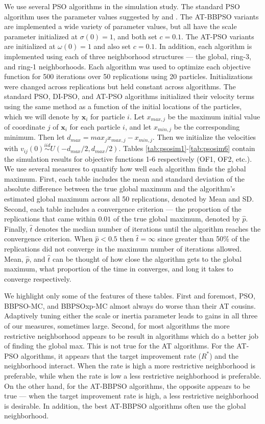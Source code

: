 \documentclass[12pt]{article}
\begin{document}
We use several PSO algorithms in the simulation study. The standard PSO algorithm uses the parameter values suggested by \cite{blum2008swarm} and \cite{clerc2002particle}. The AT-BBPSO variants are implemented a wide variety of parameter values, but all have the scale parameter initialized at $\sigma(0)=1$, and both set $c=0.1$. The AT-PSO variants are initialized at $\omega(0)=1$ and also set $c=0.1$. In addition, each algorithm is implemented using each of three neighborhood structures --- the global, ring-3, and ring-1 neighborhoods. Each algorithm was used to optimize each objective function for 500 iterations over 50 replications using 20 particles. Initializations were changed across replications but held constant across algorithms. The standard PSO, DI-PSO, and AT-PSO algorithms initialized their velocity terms using the same method as a function of the initial locations of the particles, which we will denote by $\bm{x}_i$ for particle $i$. Let $x_{max,j}$ be the maximum initial value of coordinate $j$ of $\bm{x}_i$ for each particle $i$, and let $x_{min,j}$ be the corresponding minimum. Then let $d_{max} = max_{j}x_{max,j} - x_{min,j}$. Then we initialize the velocities with $v_{ij}(0)\stackrel{iid}{\sim}U(-d_{max}/2,d_{max}/2)$. Tables \ref{tab:psosim1}-\ref{tab:psosim6} contain the simulation results for objective functions 1-6 respectively (OF1, OF2, etc.). We use several measures to quantify how well each algorithm finds the global maximum. First, each table includes the mean and standard deviation of the absolute difference between the true global maximum and the algorithm's estimated global maximum across all 50 replications, denoted by Mean and SD. Second, each table includes a convergence criterion --- the proportion of the replications that came within $0.01$ of the true global maximum, denoted by $\widehat{p}$. Finally, $\widehat{t}$ denotes the median number of iterations until the algorithm reaches the convergence criterion. When $\hat{p}<0.5$ then $\hat{t} = \infty$ since greater than 50\% of the replications did not converge in the maximum number of iterations allowed. Mean, $\hat{p}$, and $\hat{t}$ can be thought of how close the algorithm gets to the global maximum, what proportion of the time in converges, and long it takes to converge respectively.

We highlight only some of the features of these tables. First and foremost, PSO, BBPSO-MC, and BBPSOxp-MC almost always do worse than their AT cousins. Adaptively tuning either the scale or inertia parameter leads to gains in all three of our measures, sometimes large. Second, for most algorithms the more restrictive neighborhood appears to be result in algorithms which do a better job of finding the global max. This is not true for the AT algorithms. For the AT-PSO algorithms, it appears that the target improvement rate ($R^*$) and the neighborhood interact. When the rate is high a more restrictive neighborhood is preferable, while when the rate is low a less restrictive neighborhood is preferable. On the other hand, for the AT-BBPSO algorithms, the opposite appears to be true --- when the target improvement rate is high, a less restrictive neighborhood is desirable. In addition, the best AT-BBPSO algorithms often use the global neighborhood.
\end{document}
